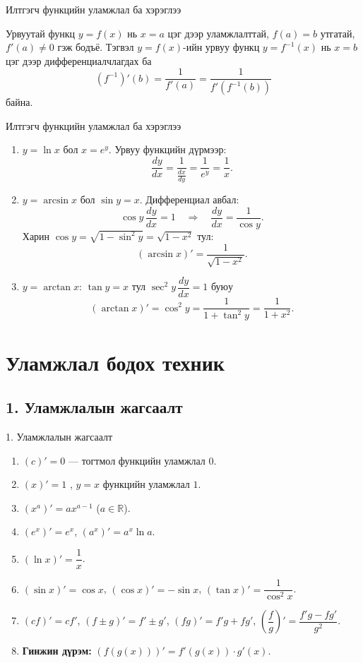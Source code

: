 \begin{frame}[allowframebreaks]{Илтгэгч функцийн уламжлал ба хэрэглээ}
\begin{theorem}
Урвуутай функц $y=f(x)$ нь $x=a$ цэг дээр уламжлалттай, $f(a)=b$ утгатай, $f'(a)\neq0$ гэж бодъё. Тэгвэл $y=f(x)$-ийн урвуу функц $y=f^{-1}(x)$ нь $x=b$ цэг дээр дифференциалчлагдах ба 
\[
\boxed{(f^{-1})'(b) = \dfrac{1}{f'(a)}=\dfrac{1}{f'(f^{-1}(b))}}
\] байна.
\end{theorem}
\end{frame}

\begin{frame}[allowframebreaks]{Илтгэгч функцийн уламжлал ба хэрэглээ}
\begin{example}
\begin{enumerate}
  \item $y=\ln x$ бол $x=e^y$. Урвуу функцийн дүрмээр:
  \[
  \frac{dy}{dx} = \frac{1}{\frac{dx}{dy}} = \frac{1}{e^y} = \frac{1}{x}.
  \]
  \item $y=\arcsin x$ бол $\sin y = x$. Дифференциал авбал:
  \[
  \cos y \, \frac{dy}{dx} = 1
  \quad \Longrightarrow \quad
  \frac{dy}{dx} = \frac{1}{\cos y}.
  \]
  Харин $\cos y = \sqrt{1-\sin^2 y}=\sqrt{1-x^2}$ тул:
  \[
  (\arcsin x)' = \frac{1}{\sqrt{1-x^2}}.
  \]
  \item $y=\arctan x$: $\tan y = x$ тул $\sec^2 y\,\dfrac{dy}{dx}=1$ буюу
  \[
  (\arctan x)'=\cos^2 y=\frac{1}{1+\tan^2 y}=\frac{1}{1+x^2}.
  \]
\end{enumerate}
\end{example}
\end{frame}

\section{Уламжлал бодох техник}
\subsection*{1. Уламжлалын жагсаалт}
\begin{frame}[allowframebreaks]{1. Уламжлалын жагсаалт}
\begin{enumerate}
  \item $(c)'=0$ — тогтмол функцийн уламжлал $0$.
  \item $(x)'=1$ , $y=x$ функцийн уламжлал $1$.
  \item $(x^{a})'=ax^{a-1}$ \;($a\in\mathbb{R}$).
  \item $(e^x)'=e^x$, \; $(a^x)'=a^x\ln a$.
  \item $(\ln x)'=\dfrac{1}{x}$.
  \item $(\sin x)'=\cos x$, \; $(\cos x)'=-\sin x$, \; $(\tan x)'=\dfrac{1}{\cos^2 x}$.
  \item $(cf)'=cf'$, \; $(f\pm g)'=f'\pm g'$, \; $(fg)'=f'g+fg'$, \;
  $\displaystyle \left(\dfrac{f}{g}\right)'=\dfrac{f'g-fg'}{g^2}$.
  \item \textbf{Гинжин дүрэм:} $(f(g(x)))'=f'(g(x))\cdot g'(x)$.
\end{enumerate}
\end{frame}

